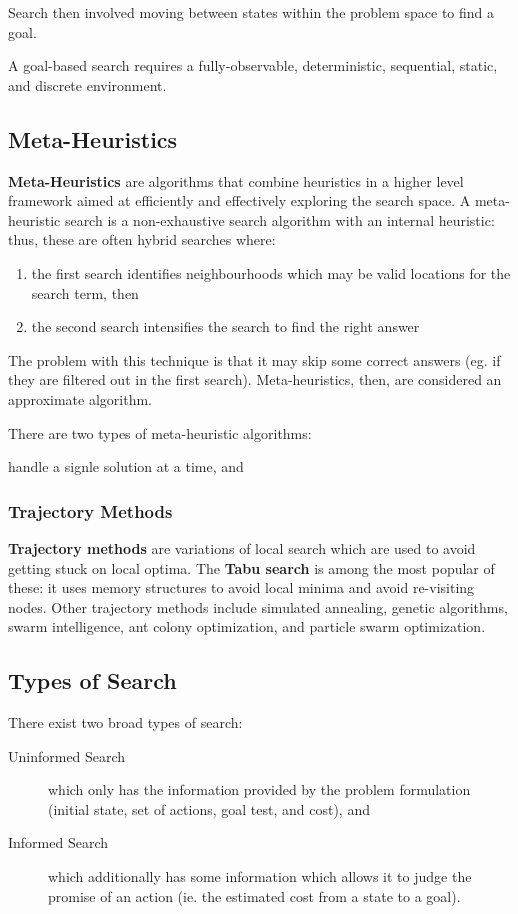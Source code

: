 \documentclass[12pt]{article}
\begin{document}
Search then involved moving between states within the problem space to find a goal.

A goal-based search requires a fully-observable, deterministic, sequential, static, and discrete environment.

\subsection{Meta-Heuristics}
{\bf Meta-Heuristics} are algorithms that combine heuristics in a higher level framework aimed at efficiently and effectively exploring the search space. A meta-heuristic search is a non-exhaustive search algorithm with an internal heuristic: thus, these are often hybrid searches where:
\begin{enumerate}
\item the first search identifies neighbourhoods which may be valid locations for the search term, then
\item the second search intensifies the search to find the right answer
\end{enumerate}

The problem with this technique is that it may skip some correct answers (eg. if they are filtered out in the first search). Meta-heuristics, then, are considered an approximate algorithm.

There are two types of meta-heuristic algorithms:
\begin{description}
\item [trajectory methods] handle a signle solution at a time, and
\item
\end{description}

\subsubsection{Trajectory Methods}
{\bf Trajectory methods} are variations of local search which are used to avoid getting stuck on local optima. The {\bf Tabu search} is among the most popular of these: it uses memory structures to avoid local minima and avoid re-visiting nodes. Other trajectory methods include simulated annealing, genetic algorithms, swarm intelligence, ant colony optimization, and particle swarm optimization.

\subsection{Types of Search}
There exist two broad types of search:
\begin{description}
\item[Uninformed Search] which only has the information provided by the problem formulation (initial state, set of actions, goal test, and cost), and
\item[Informed Search] which additionally has some information which allows it to judge the promise of an action (ie. the estimated cost from a state to a goal).
\end{description}
\end{document}
